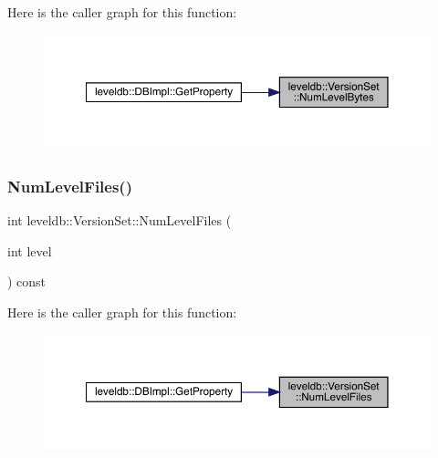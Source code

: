 Here is the caller graph for this function\+:
\nopagebreak
\begin{figure}[H]
\begin{center}
\leavevmode
\includegraphics[width=350pt]{classleveldb_1_1_version_set_a02d41742ab464b83e06c7ab347db2126_icgraph}
\end{center}
\end{figure}
\mbox{\label{classleveldb_1_1_version_set_ac23afa1a53cf1f3b18319312b7681ee6}} 
\subsubsection{\texorpdfstring{NumLevelFiles()}{NumLevelFiles()}}
{\footnotesize\ttfamily int leveldb\+::\+Version\+Set\+::\+Num\+Level\+Files (\begin{DoxyParamCaption}\item[{int}]{level }\end{DoxyParamCaption}) const}

Here is the caller graph for this function\+:
\nopagebreak
\begin{figure}[H]
\begin{center}
\leavevmode
\includegraphics[width=350pt]{classleveldb_1_1_version_set_ac23afa1a53cf1f3b18319312b7681ee6_icgraph}
\end{center}
\end{figure}
\mbox{\label{classleveldb_1_1_version_set_a1cdc6a05e0a7df9f29b5bccd485a0219}} 
